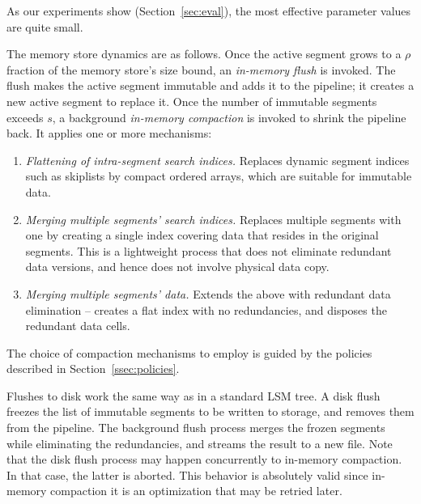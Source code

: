 \noindent
As our experiments show (Section~\ref{sec:eval}), the most effective parameter values are quite small.

The memory store dynamics are as follows. 
Once the active segment grows to a $\rho$ fraction of the memory store's size bound, an \emph{in-memory flush} is invoked.
The flush makes the active segment  immutable and adds it to the pipeline; it creates a new active segment to replace it. 
Once the number of immutable segments exceeds $s$, a background \emph{in-memory compaction} is invoked to shrink
the pipeline back. It applies one or more mechanisms: 
\begin{enumerate}
\item {\em Flattening of intra-segment search indices.} Replaces dynamic segment indices such as skiplists by 
compact ordered arrays, which are suitable for immutable data. 
\item {\em Merging multiple segments' search indices.} 
Replaces multiple segments with one by creating a single index covering data that resides 
in the original segments. This is a lightweight process that does not eliminate redundant 
data versions, and hence does not involve physical data copy. 
\item  {\em Merging multiple segments' data.} Extends the above with redundant data elimination --
creates a flat index with no redundancies, and disposes the redundant data cells. 
\end{enumerate} 
The choice of compaction mechanisms to employ is guided by the policies described in Section~\ref{ssec:policies}.

Flushes to disk work the same way as in a standard LSM tree. A disk flush freezes the list of immutable segments 
to be written to storage, and removes them from the pipeline. The background flush process merges the frozen 
segments while eliminating the redundancies, and streams the result to a new file. Note that the disk flush process
may happen concurrently to in-memory compaction. In that case, the latter is aborted. This behavior is absolutely
valid since in-memory compaction it is an optimization that may be retried later.


